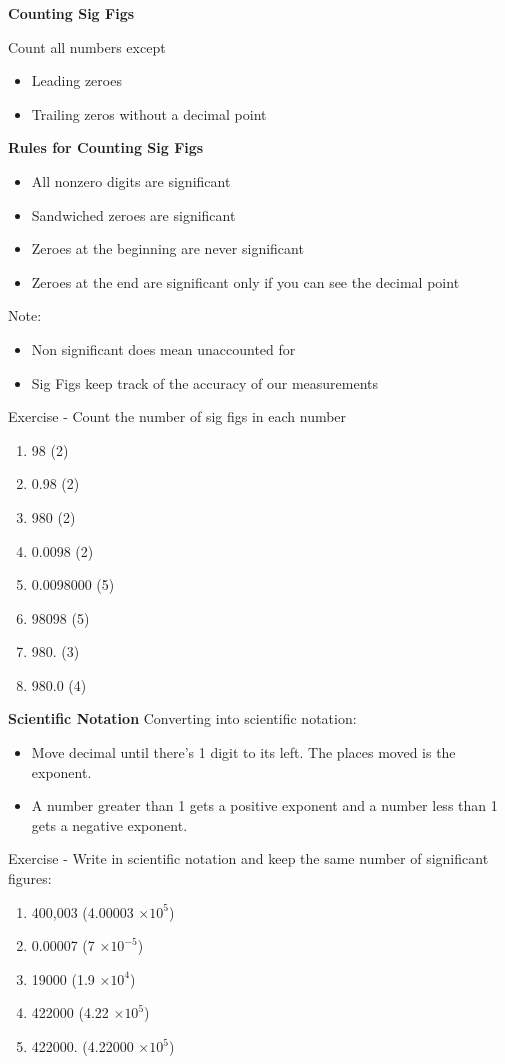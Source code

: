 \documentclass[../hchem.tex]{subfiles}
\begin{document}
\textbf{Counting Sig Figs}

Count all numbers except
\begin{itemize}
    \item Leading zeroes 
    \item Trailing zeros without a decimal point 
\end{itemize}

\textbf{Rules for Counting Sig Figs}
\begin{itemize}
    \item All nonzero digits are significant 
    \item Sandwiched zeroes are significant 
    \item Zeroes at the beginning are never significant
    \item Zeroes at the end are significant only if you can see the decimal point 
\end{itemize}
Note:
\begin{itemize}
    \item Non significant does mean unaccounted for 
    \item Sig Figs keep track of the accuracy of our measurements 
\end{itemize}

Exercise - Count the number of sig figs in each number 
\begin{enumerate}
    \item 98 (2)
    \item 0.98 (2)
    \item 980 (2)
    \item 0.0098 (2)
    \item 0.0098000 (5)
    \item 98098 (5)
    \item 980. (3)
    \item 980.0 (4)
\end{enumerate}

\textbf{Scientific Notation}
Converting into scientific notation:
\begin{itemize}
    \item Move decimal until there's 1 digit to its left. The places moved is the exponent.
    \item A number greater than 1 gets a positive exponent and a number less than 1 gets a negative exponent.
\end{itemize}

Exercise - Write in scientific notation and keep the same number of significant figures:
\begin{enumerate}
    \item 400,003 (4.00003 $\times 10^5$)
    \item 0.00007 (7 $\times 10^{-5}$)
    \item 19000 (1.9 $\times 10^4$)
    \item 422000 (4.22 $\times 10^5$)
    \item 422000. (4.22000 $\times 10^5$)
\end{enumerate}
\end{document}
